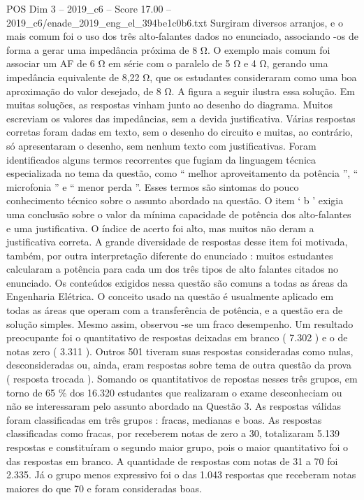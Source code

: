 \begin{textsample}{POS Dim 3 – 2019\_c6 – Score 17.00 – 2019\_c6/enade\_2019\_eng\_el\_394be1c0b6.txt}
Surgiram diversos arranjos, e o mais comum foi o uso dos três alto-falantes dados no enunciado, associando -os de forma a gerar uma impedância próxima de 8 Ω.
O exemplo mais comum foi associar um AF de 6 Ω em série com o paralelo de 5 Ω e 4 Ω, gerando uma impedância equivalente de 8,22 Ω, que os estudantes consideraram como uma boa aproximação do valor desejado, de 8 Ω.
A figura a seguir ilustra essa solução.
Em muitas soluções, as respostas vinham junto ao desenho do diagrama.
Muitos escreviam os valores das impedâncias, sem a devida justificativa.
Várias respostas corretas foram dadas em texto, sem o desenho do circuito e muitas, ao contrário, só apresentaram o desenho, sem nenhum texto com justificativas.
Foram identificados alguns termos recorrentes que fugiam da linguagem técnica especializada no tema da questão, como “ melhor aproveitamento da potência ”, “ microfonia ” e “ menor perda ”.
Esses termos são sintomas do pouco conhecimento técnico sobre o assunto abordado na questão.
O item ‘ b ’ exigia uma conclusão sobre o valor da mínima capacidade de potência dos alto-falantes e uma justificativa.
O índice de acerto foi alto, mas muitos não deram a justificativa correta.
A grande diversidade de respostas desse item foi motivada, também, por outra interpretação diferente do enunciado : muitos estudantes calcularam a potência para cada um dos três tipos de alto falantes citados no enunciado.
Os conteúdos exigidos nessa questão são comuns a todas as áreas da Engenharia Elétrica.
O conceito usado na questão é usualmente aplicado em todas as áreas que operam com a transferência de potência, e a questão era de solução simples.
Mesmo assim, observou -se um fraco desempenho.
Um resultado preocupante foi o quantitativo de respostas deixadas em branco ( 7.302 ) e o de notas zero ( 3.311 ).
Outros 501 tiveram suas respostas consideradas como nulas, desconsideradas ou, ainda, eram respostas sobre tema de outra questão da prova ( resposta trocada ).
Somando os quantitativos de repostas nesses três grupos, em torno de 65 \% dos 16.320 estudantes que realizaram o exame desconheciam ou não se interessaram pelo assunto abordado na Questão 3.
As respostas válidas foram classificadas em três grupos : fracas, medianas e boas.
As respostas classificadas como fracas, por receberem notas de zero a 30, totalizaram 5.139 respostas e constituíram o segundo maior grupo, pois o maior quantitativo foi o das respostas em branco.
A quantidade de respostas com notas de 31 a 70 foi 2.335.
Já o grupo menos expressivo foi o das 1.043 respostas que receberam notas maiores do que 70 e foram consideradas boas.

\end{textsample}

